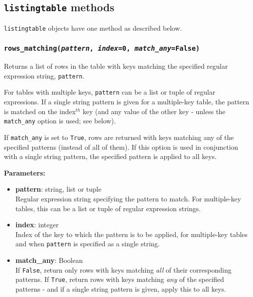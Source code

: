 \subsection{\texttt{listingtable} methods}

\texttt{listingtable} objects have one method as described below.

\begin{snugshade}
\subsubsection{\texttt{rows\_matching(\emph{pattern}, \emph{index}=0, \emph{match\_any}=False)}}
\end{snugshade}

Returns a list of rows in the table with keys matching the specified regular expression string, \texttt{pattern}.

For tables with multiple keys, \texttt{pattern} can be a list or tuple of regular expressions.  If a single string pattern is given for a multiple-key table, the pattern is matched on the index$^{th}$ key (and any value of the other key - unless the \texttt{match\_any} option is used; see below).

If \texttt{match\_any} is set to \texttt{True}, rows are returned with keys matching any of the specified patterns (instead of all of them).  If this option is used in conjunction with a single string pattern, the specified pattern is applied to all keys.

\textbf{Parameters:}
\begin{itemize}
\item \textbf{pattern}: string, list or tuple\\
  Regular expression string specifying the pattern to match.  For multiple-key tables, this can be a list or tuple of regular expression strings.
\item \textbf{index}: integer\\
  Index of the key to which the pattern is to be applied, for multiple-key tables and when \texttt{pattern} is specified as a single string.
\item \textbf{match\_any}: Boolean\\
  If \texttt{False}, return only rows with keys matching \emph{all} of their corresponding patterns.  If \texttt{True}, return rows with keys matching \emph{any} of the specified patterns - and if a single string pattern is given, apply this to all keys.
\end{itemize}

